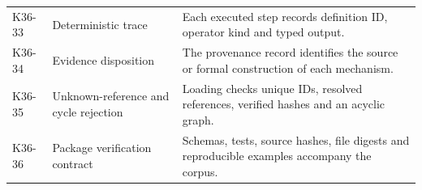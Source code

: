 \begin{longtable}{@{}p{}p{}p{}@{}}
K36-33 & Deterministic trace & Each executed step records definition ID, operator kind and typed output.\\[5pt]
K36-34 & Evidence disposition & The provenance record identifies the source or formal construction of each mechanism.\\[5pt]
K36-35 & Unknown-reference and cycle rejection & Loading checks unique IDs, resolved references, verified hashes and an acyclic graph.\\[5pt]
K36-36 & Package verification contract & Schemas, tests, source hashes, file digests and reproducible examples accompany the corpus.\\[5pt]
\end{longtable}
